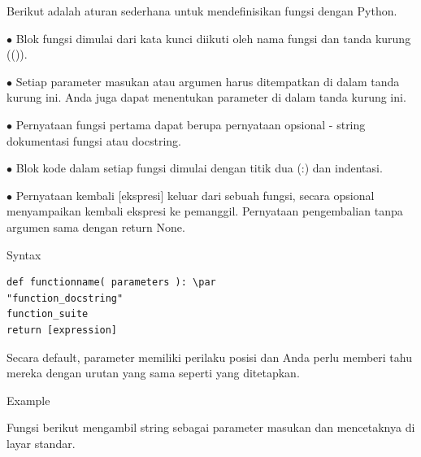 \vspace{\baselineskip}
Berikut adalah aturan sederhana untuk mendefinisikan fungsi dengan Python.\par
\vspace{\baselineskip}
\noindent 
 $ \bullet $ Blok fungsi dimulai dari kata kunci diikuti oleh nama fungsi dan tanda kurung (()). \par
 \vspace{\baselineskip}
\noindent 
 $ \bullet $ Setiap parameter masukan atau argumen harus ditempatkan di dalam tanda kurung ini. Anda juga dapat menentukan parameter di dalam tanda kurung ini. \par
 \vspace{\baselineskip}
\noindent 
 $ \bullet $ Pernyataan fungsi pertama dapat berupa pernyataan opsional - string dokumentasi fungsi atau docstring. \par
 \vspace{\baselineskip}
\noindent 
 $ \bullet $ Blok kode dalam setiap fungsi dimulai dengan titik dua (:) dan indentasi. \par
 \vspace{\baselineskip}
\noindent 
 $ \bullet $ Pernyataan kembali [ekspresi] keluar dari sebuah fungsi, secara opsional menyampaikan kembali ekspresi ke pemanggil. Pernyataan pengembalian tanpa argumen sama dengan return None. \par
\vspace{12pt}
\vspace{\baselineskip}
\noindent 
Syntax \par
\begin{verbatim}
def functionname( parameters ): \par
"function_docstring"
function_suite
return [expression]
\end{verbatim}

\vspace{\baselineskip}
\noindent 
Secara default, parameter memiliki perilaku posisi dan Anda perlu memberi tahu mereka dengan urutan yang sama seperti yang ditetapkan. \par
\vspace{12pt}
\vspace{\baselineskip}
\vspace{12pt}
\noindent 
Example \par
\vspace{\baselineskip}
\noindent 
Fungsi berikut mengambil string sebagai parameter masukan dan mencetaknya di layar standar. \par

